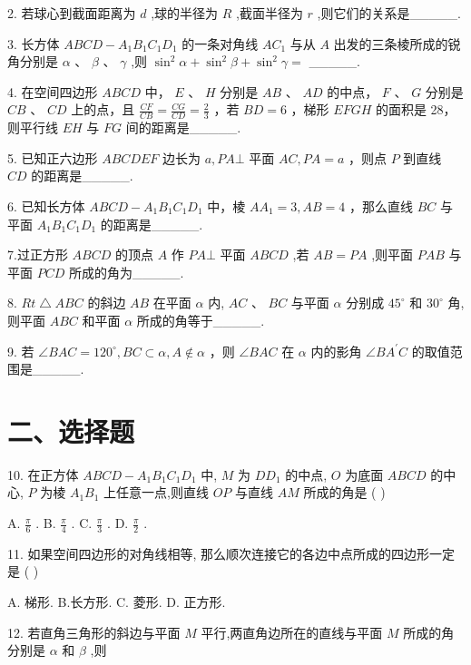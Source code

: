 2. 若球心到截面距离为 $d$ ,球的半径为 $R$ ,截面半径为 $r$ ,则它们的关系是\_\_\_\_\_.

3. 长方体 ${ABCD} - {A}_{1}{B}_{1}{C}_{1}{D}_{1}$ 的一条对角线 $A{C}_{1}$ 与从 $A$ 出发的三条棱所成的锐角分别是 $\alpha$ 、 $\beta$ 、 $\gamma$ ,则 ${\sin }^{2}\alpha  + {\sin }^{2}\beta  + {\sin }^{2}\gamma  =$ \_\_\_\_\_.

4. 在空间四边形 ${ABCD}$ 中， $E$ 、 $H$ 分别是 ${AB}$ 、 ${AD}$ 的中点， $F$ 、 $G$ 分别是 ${CB}$ 、 ${CD}$ 上的点，且 $\frac{CF}{CB} = \frac{CG}{CD} =  \frac{2}{3}$ ，若 ${BD} = 6$ ，梯形 ${EFGH}$ 的面积是 28，则平行线 ${EH}$ 与 ${FG}$ 间的距离是\_\_\_\_\_.

5. 已知正六边形 ${ABCDEF}$ 边长为 $a,{PA}\bot$ 平面 ${AC},{PA} = a$ ，则点 $P$ 到直线 ${CD}$ 的距离是\_\_\_\_\_.

6. 已知长方体 ${ABCD} - {A}_{1}{B}_{1}{C}_{1}{D}_{1}$ 中，棱 $A{A}_{1} = 3,{AB} = 4$ ，那么直线 ${BC}$ 与平面 ${A}_{1}{B}_{1}{C}_{1}{D}_{1}$ 的距离是\_\_\_\_\_.

7.过正方形 ${ABCD}$ 的顶点 $A$ 作 ${PA} \bot$ 平面 ${ABCD}$ ,若 ${AB} = {PA}$ ,则平面 ${PAB}$ 与平面 ${PCD}$ 所成的角为\_\_\_\_\_.

8. ${{Rt}} \bigtriangleup  {ABC}$ 的斜边 ${AB}$ 在平面 $\alpha$ 内, ${AC}\text{ 、 }{BC}$ 与平面 $\alpha$ 分别成 ${45}^{ \circ  }$ 和 ${30}^{ \circ  }$ 角,则平面 ${ABC}$ 和平面 $\alpha$ 所成的角等于\_\_\_\_\_.

9. 若 $\angle {BAC} = {120}^{ \circ  },{BC} \subset  \alpha ,A \notin  \alpha$ ，则 $\angle {BAC}$ 在 $\alpha$ 内的影角 $\angle {B{A}^{\prime }}C$ 的取值范围是\_\_\_\_\_.

\section*{二、选择题}

10. 在正方体 ${ABCD} - {A}_{1}{B}_{1}{C}_{1}{D}_{1}$ 中, $M$ 为 $D{D}_{1}$ 的中点, $O$ 为底面 ${ABCD}$ 的中心, $P$ 为棱 ${A}_{1}{B}_{1}$ 上任意一点,则直线 ${OP}$ 与直线 ${AM}$ 所成的角是 ( )

A. $\frac{\pi }{6}$ . B. $\frac{\pi }{4}$ . C. $\frac{\pi }{3}$ . D. $\frac{\pi }{2}$ .

11. 如果空间四边形的对角线相等, 那么顺次连接它的各边中点所成的四边形一定是 ( )

A. 梯形. B.长方形. C. 菱形. D. 正方形.

12. 若直角三角形的斜边与平面 $M$ 平行,两直角边所在的直线与平面 $M$ 所成的角分别是 $\alpha$ 和 $\beta$ ,则

